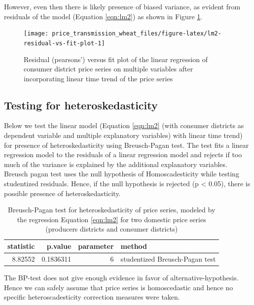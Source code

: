 \documentclass[12pt,]{article}
\begin{document}
However, even then there is likely presence of biased variance, as evident from residuals of the model (Equation \ref{eqn:lm2}) as shown in Figure \ref{fig:lm2-residual-vs-fit-plot}.

\begin{figure}

{\centering \texttt{[image: price\_transmission\_wheat\_files/figure-latex/lm2-residual-vs-fit-plot-1]} 

}

\caption{Residual (pearsons') versus fit plot of the linear regression of consumer district price series on multiple variables after incorporating linear time trend of the price series}\label{fig:lm2-residual-vs-fit-plot}
\end{figure}

\hypertarget{testing-for-heteroskedasticity}{%
\subsection{Testing for heteroskedasticity}\label{testing-for-heteroskedasticity}}

Below we test the linear model (Equation \ref{eqn:lm2} (with consumer districts as dependent variable and multiple explanatory variables) with linear time trend) for presence of heteroskedasticity using Breusch-Pagan test. The test fits a linear regression model to the residuals of a linear regression model and rejects if too much of the variance is explained by the additional explanatory variables. Breusch pagan test uses the null hypothesis of Homoscadesticity while testing studentized residuals. Hence, if the null hypothesis is rejected (p \textless{} 0.05), there is possible presence of heteroskedasticity.

\begin{table}

\caption{\label{tab:lm2-bptest}Breusch-Pagan test for heteroskedasticity of price series, modeled by the regression Equation \ref{eqn:lm2} for two domestic price series (producers districts and consumer districts)}
\centering
\begin{tabular}[t]{rrrl}
\toprule
statistic & p.value & parameter & method\\
\midrule
8.82552 & 0.1836311 & 6 & studentized Breusch-Pagan test\\
\bottomrule
\end{tabular}
\end{table}

The BP-test does not give enough evidence in favor of alternative-hypothesis. Hence we can safely assume that price series is homoscedastic and hence no specific heteroscadesticity correction measures were taken.
\end{document}
